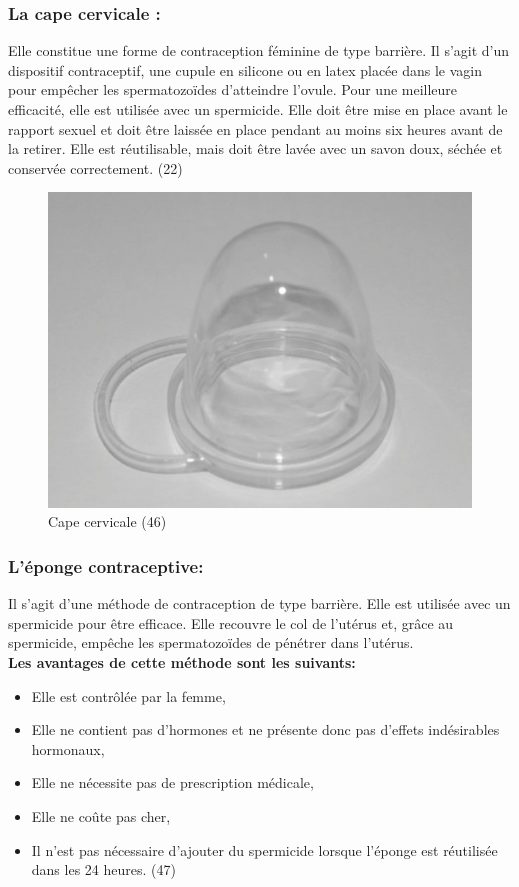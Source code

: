 \subsubsection{La cape cervicale :}

\noindent Elle constitue une forme de contraception féminine de type barrière. Il s’agit d’un dispositif contraceptif, une cupule en silicone ou en latex placée dans le vagin pour empêcher les spermatozoïdes d’atteindre l’ovule. Pour une meilleure efficacité, elle est utilisée avec un spermicide. Elle doit être mise en place avant le rapport sexuel et doit être laissée en place pendant au moins six heures avant de la retirer. Elle est réutilisable, mais doit être lavée avec un savon doux, séchée et conservée correctement. (22)

\begin{figure}[H]
  \centering
  \includegraphics{Images/fig_22.jpg}
  \caption{Cape cervicale (46)}
\end{figure}

\subsubsection{L’éponge contraceptive: }
Il s’agit d’une méthode de contraception de type barrière. Elle est utilisée avec un spermicide pour être efficace. Elle recouvre le col de l’utérus et, grâce au spermicide, empêche les spermatozoïdes de pénétrer dans l’utérus.\\

\noindent \textbf{Les avantages de cette méthode sont les suivants:}

\begin{itemize}[label={$\bullet$}, align=right]
  \item	Elle est contrôlée par la femme,
  \item Elle ne contient pas d’hormones et ne présente donc pas d’effets indésirables hormonaux, 
  \item Elle ne nécessite pas de prescription médicale,
  \item	Elle ne coûte pas cher, 
  \item Il n’est pas nécessaire d’ajouter du spermicide lorsque l’éponge est réutilisée dans les 24 heures. (47)
\end{itemize}


